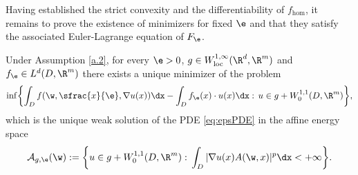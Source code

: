 Having established the strict convexity and the differentiability of $f_{\hom}$, it remains to prove the existence of minimizers for fixed $\e$ and that they satisfy the associated Euler-Lagrange equation of $F_{\e}$.
\begin{lemma}\label{l.epsexistence}
Under Assumption \ref{a.2}, for every $\e>0$, $g\in W^{1,\infty}_\mathrm{loc}(\R^d,\R^m)$ and $f_{\e}\in L^d(D,\R^m)$ there exists a unique minimizer of the problem
\begin{equation*}
\inf \biggl\{\int_D f(\w,\sfrac{x}{\e},\nabla u(x))\dx-\int_D f_{\e}(x)\cdot u(x)\dx:\,u\in g+W_0^{1,1}(D,\R^m)\biggr\},
\end{equation*}
which is the unique weak solution of the PDE \eqref{eq:epsPDE} in the affine energy space
\begin{equation*}
\mathcal{A}_{g,\e}(\w):=\biggl\{u\in g+W_0^{1,1}(D,\R^m):\,\int_D|\nabla u(x)A(\w,x)|^p\dx<+\infty\biggr\}.
\end{equation*}
\end{lemma}
